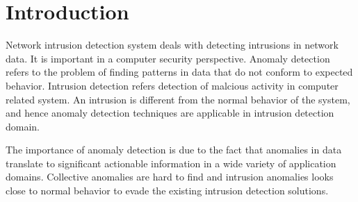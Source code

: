 \section{Introduction}
Network intrusion detection system deals with detecting intrusions in network data. It is important in a computer security perspective. Anomaly detection refers to the problem of finding patterns in data that do not conform to expected behavior\cite{chandola09}. Intrusion detection refers detection of malcious activity in computer related system. An intrusion is different from the normal behavior of the system, and hence anomaly detection techniques are applicable in intrusion detection domain. \cite{chandola09}

The importance of anomaly detection is due to the fact that anomalies in data translate to significant actionable information in a wide variety of application domains\cite{chandola09}. Collective anomalies are hard to find and intrusion anomalies looks close to normal behavior to evade the existing intrusion detection solutions\cite{chandola09}.
